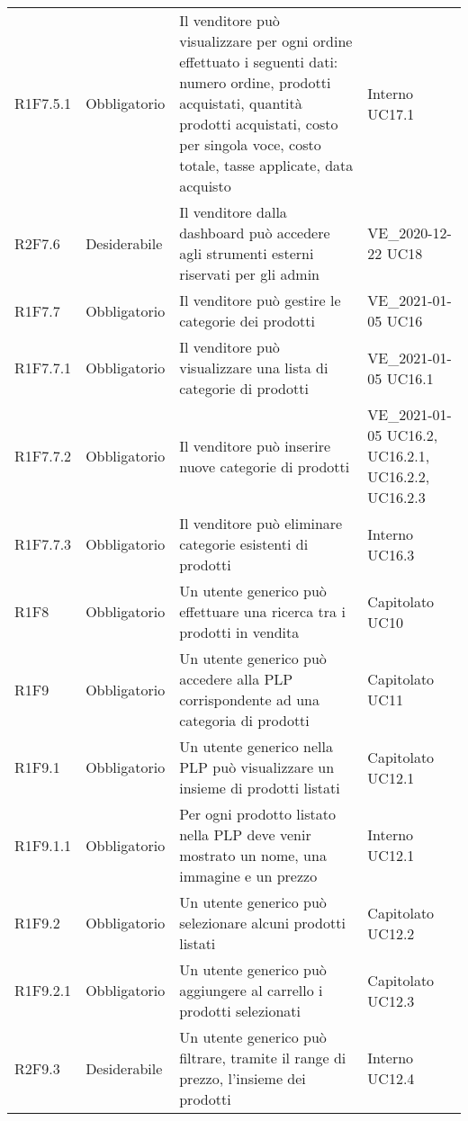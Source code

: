 {\begin{longtable}{C{2.5cm} C{2.8cm} C{6.7cm} C{2.5cm}}
R1F7.5.1 & Obbligatorio & Il venditore può visualizzare per ogni ordine effettuato i seguenti dati: numero ordine, prodotti acquistati, quantità prodotti acquistati, costo per singola voce, costo totale, tasse applicate, data acquisto & Interno \newline UC17.1\\
R2F7.6 & Desiderabile & Il venditore dalla dashboard può accedere agli strumenti esterni riservati per gli admin & VE\_2020-12-22 \newline UC18\\
R1F7.7 & Obbligatorio & Il venditore può gestire le categorie dei prodotti & VE\_2021-01-05 \newline UC16\\
R1F7.7.1 & Obbligatorio & Il venditore può visualizzare una lista di categorie di prodotti & VE\_2021-01-05 \newline UC16.1\\
R1F7.7.2 & Obbligatorio & Il venditore può inserire nuove categorie di prodotti & VE\_2021-01-05 \newline UC16.2, UC16.2.1, UC16.2.2, UC16.2.3\\
R1F7.7.3 & Obbligatorio & Il venditore può eliminare categorie esistenti di prodotti & Interno \newline UC16.3\\


R1F8 & Obbligatorio & Un utente generico può effettuare una ricerca tra i prodotti in vendita & Capitolato \newline UC10\\


R1F9 & Obbligatorio & Un utente generico può accedere alla PLP corrispondente ad una categoria di prodotti & Capitolato \newline UC11 \\
R1F9.1 & Obbligatorio & Un utente generico nella PLP può visualizzare un insieme di prodotti listati & Capitolato \newline UC12.1\\
R1F9.1.1 & Obbligatorio & Per ogni prodotto listato nella PLP deve venir mostrato un nome, una immagine e un prezzo & Interno \newline UC12.1\\
R1F9.2 & Obbligatorio & Un utente generico può selezionare alcuni prodotti listati & Capitolato \newline UC12.2\\
R1F9.2.1 & Obbligatorio & Un utente generico può aggiungere al carrello i prodotti selezionati & Capitolato \newline UC12.3\\
R2F9.3 & Desiderabile & Un utente generico può filtrare, tramite il range di prezzo, l'insieme dei prodotti & Interno \newline UC12.4\\


\end{longtable}}
